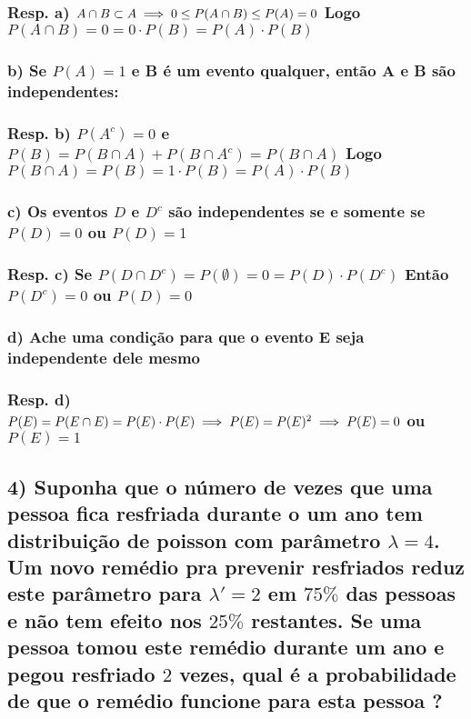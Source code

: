 \documentclass[portuguese]{article}
\begin{document}
\subsubsection*{\textmd{Resp. a) $A\cap B\subset A\protect\implies0\le P(A\cap B)\le P(A)=0$
Logo $P(A\cap B)=0=0\cdot P(B)=P(A)\cdot P(B)$}}


\subsubsection*{\textmd{b) Se $P(A)=1$ e B é um evento qualquer, então A e B são
independentes:}}


\subsubsection*{\textmd{Resp. b) $P(A^{c})=0$ e $P(B)=P(B\cap A)+P(B\cap A^{c})=P(B\cap A)$
Logo $P(B\cap A)=P(B)=1\cdot P(B)=P(A)\cdot P(B)$}}


\subsubsection*{\textmd{c) Os eventos $D$ e $D^{c}$ são independentes se e somente
se $P(D)=0$ ou $P(D)=1$}}


\subsubsection*{\textmd{Resp. c) Se $P(D\cap D^{c})=P(\emptyset)=0=P(D)\cdot P(D^{c})$
Então $P(D^{c})=0$ ou $P(D)=0$ }}


\subsubsection*{\textmd{d) Ache uma condição para que o evento E seja independente
dele mesmo}}


\subsubsection*{\textmd{Resp. d) $P(E)=P(E\cap E)=P(E)\cdot P(E)\protect\implies P(E)=P(E)^{2}\protect\implies P(E)=0$
ou $P(E)=1$}}

\textbf{\textcompwordmark{}}


\subsection*{\textmd{4) Suponha que o número de vezes que uma pessoa fica resfriada
durante o um ano tem distribuição de poisson com parâmetro $\lambda=4$.
Um novo remédio pra prevenir resfriados reduz este parâmetro para
$\lambda'=2$ em $75\%$ das pessoas e não tem efeito nos $25\%$
restantes. Se uma pessoa tomou este remédio durante um ano e pegou
resfriado $2$ vezes, qual é a probabilidade de que o remédio funcione
para esta pessoa ?}}
\end{document}
